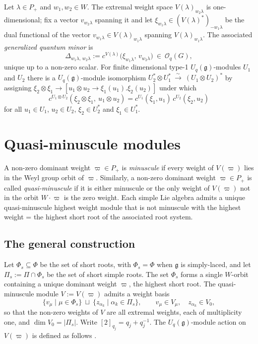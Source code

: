 \documentclass[12pt]{amsart}
\theoremstyle{plain}
\theoremstyle{remark}
\newcommand{\g}{\mathfrak{g}}
\newcommand{\Uq}{U_q(\g)}
\newcommand{\ot}{\otimes}
\newcommand{\vp}{\varpi}
\newcommand{\Phis}{\Phi_{s}}
\newcommand{\Pis}{\Pi_{s}}
\begin{document}
Let $\lambda\in P_+$ and $w_1,w_2\in W$. The extremal weight space $V(\lambda)_{w_2\lambda}$
is one-dimensional; fix a vector $v_{w_2\lambda}$ spanning it and let
$\xi_{w_1\lambda}\in(V(\lambda)^*)_{-w_1\lambda}$ be the dual functional of the vector $v_{w_1\lambda}\in V(\lambda)_{w_1\lambda}$ spanning $V(\lambda)_{w_1\lambda}$. The associated
\emph{generalized quantum minor} is
\[
\Delta_{w_1\lambda,\,w_2\lambda}:=c^{V(\lambda)}\big(\xi_{w_1\lambda},\,v_{w_2\lambda}\big)
\ \in\ \mathcal{O}_q(G),
\]
unique up to a non-zero scalar. For finite dimensional type-1 $\Uq$-modules $U_1$ and $U_2$
there is a $\Uq$-module isomorphism $U_2^*\ot U_1^*\ \xrightarrow{\ \sim\ }\ (U_1\ot U_2)^*$ by assigning $\xi_2\otimes \xi_1\to [u_1\otimes u_2 \to \xi_1(u_1).\xi_2(u_2)]$
under which
\begin{equation}\label{eq:mult}
c^{U_1\ot U_2}(\xi_2\ot\xi_1,\ u_1\ot u_2)=c^{U_1}(\xi_1,u_1)\,c^{U_2}(\xi_2,u_2)
\end{equation}
for all $u_1\in U_1$, $u_2\in U_2$, $\xi_2\in U_2^*$ and $\xi_1\in U_1^*$.

\section{Quasi-minuscule modules}\label{sec:qm}
A non-zero dominant weight $\vp \in P_+$ is \emph{minuscule} if every weight of $V(\vp)$ lies in the Weyl group orbit of $\vp$. Similarly, a non-zero dominant weight $\vp \in P_+$ is called \emph{quasi-minuscule} if it is either minuscule or the only weight of $V(\vp)$ not in the orbit $W\cdot\vp$ is the zero weight. Each simple Lie algebra admits a unique quasi-minuscule highest weight module that is not minuscule with the highest weight = the highest short root of the associated root system. 
\subsection{The general construction}\label{ss:qmgen}
Let $\Phis\subseteq\Phi$ be the set
of short roots, with $\Phis=\Phi$ when $\g$ is simply-laced, and let
$\Pis:=\Pi\cap\Phis$ be the set of short simple roots. The set $\Phis$ forms a single
$W$-orbit containing a unique dominant weight $\vp$, the highest short root. The
quasi-minuscule module $V:=V(\vp)$ admits a weight basis
\begin{equation}\label{eq:qmbasis}
\{v_\mu\mid\mu\in\Phis\}\ \sqcup\ \{z_{\alpha_k}\mid\alpha_k\in\Pis\},
\qquad v_\mu\in V_\mu,\quad z_{\alpha_k}\in V_0,
\end{equation}
so that the non-zero weights of $V$ are all extremal weights, each of multiplicity one, and
$\dim V_0=|\Pis|$. Write $[2]_{q_j}=q_j+q_j^{-1}$. The
$\Uq$-module action on $V(\vp)$ is defined as follows \cite[5A.2]{Jantzen}.
\end{document}
